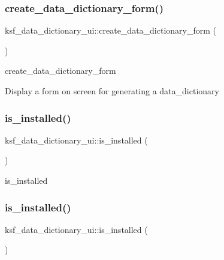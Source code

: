 \subsubsection{\texorpdfstring{create\+\_\+data\+\_\+dictionary\+\_\+form()}{create\_data\_dictionary\_form()}\hspace{0.1cm}{\footnotesize\ttfamily [2/2]}}
{\footnotesize\ttfamily ksf\+\_\+data\+\_\+dictionary\+\_\+ui\+::create\+\_\+data\+\_\+dictionary\+\_\+form (\begin{DoxyParamCaption}{ }\end{DoxyParamCaption})}

create\+\_\+data\+\_\+dictionary\+\_\+form

Display a form on screen for generating a data\+\_\+dictionary \hypertarget{classksf__data__dictionary__ui_a0a29d77c9427ed3b3c76926f3810fab5}{}\label{classksf__data__dictionary__ui_a0a29d77c9427ed3b3c76926f3810fab5} 
\subsubsection{\texorpdfstring{is\+\_\+installed()}{is\_installed()}\hspace{0.1cm}{\footnotesize\ttfamily [1/2]}}
{\footnotesize\ttfamily ksf\+\_\+data\+\_\+dictionary\+\_\+ui\+::is\+\_\+installed (\begin{DoxyParamCaption}{ }\end{DoxyParamCaption})}

is\+\_\+installed \hypertarget{classksf__data__dictionary__ui_a0a29d77c9427ed3b3c76926f3810fab5}{}\label{classksf__data__dictionary__ui_a0a29d77c9427ed3b3c76926f3810fab5} 
\subsubsection{\texorpdfstring{is\+\_\+installed()}{is\_installed()}\hspace{0.1cm}{\footnotesize\ttfamily [2/2]}}
{\footnotesize\ttfamily ksf\+\_\+data\+\_\+dictionary\+\_\+ui\+::is\+\_\+installed (\begin{DoxyParamCaption}{ }\end{DoxyParamCaption})}

